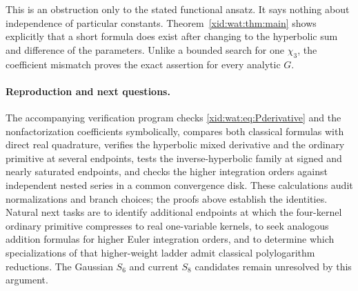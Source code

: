 This is an obstruction only to the stated functional ansatz. It says
nothing about independence of particular constants. Theorem~\ref{xid:wat:thm:main}
shows explicitly that a short formula does exist after changing to
the hyperbolic sum and difference of the parameters.
Unlike a bounded search for one $\chi_3$, the coefficient mismatch
proves the exact assertion for every analytic $G$.

\paragraph{Reproduction and next questions.}
The accompanying verification program checks
\eqref{xid:wat:eq:Pderivative} and the nonfactorization coefficients
symbolically, compares both classical formulas with direct real
quadrature, verifies the hyperbolic mixed derivative and the
ordinary primitive at several endpoints,
tests the inverse-hyperbolic family at signed and nearly saturated
endpoints, and checks the higher integration orders against independent nested
series in a common convergence disk. These calculations audit
normalizations and branch choices; the proofs above establish the
identities. Natural next tasks are to identify additional endpoints
at which the four-kernel ordinary primitive compresses to real
one-variable kernels, to seek analogous addition formulas for higher
Euler integration orders, and to determine which specializations
of that higher-weight ladder admit classical polylogarithm reductions.
The Gaussian $S_6$ and current $S_8$
candidates remain unresolved by this argument.
